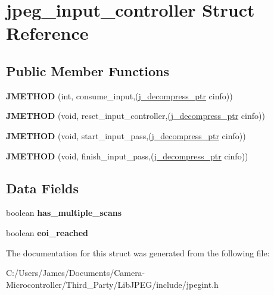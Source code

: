 \hypertarget{structjpeg__input__controller}{}\section{jpeg\+\_\+input\+\_\+controller Struct Reference}
\label{structjpeg__input__controller}
\subsection*{Public Member Functions}
\begin{DoxyCompactItemize}
\item 
\mbox{\label{structjpeg__input__controller_a8a59f501149d0f9fb8dc6d6ae18f819f}} 
{\bfseries J\+M\+E\+T\+H\+OD} (int, consume\+\_\+input,(\hyperlink{structjpeg__decompress__struct}{j\+\_\+decompress\+\_\+ptr} cinfo))
\item 
\mbox{\label{structjpeg__input__controller_a716de06ea9474eb56db8717a35204666}} 
{\bfseries J\+M\+E\+T\+H\+OD} (void, reset\+\_\+input\+\_\+controller,(\hyperlink{structjpeg__decompress__struct}{j\+\_\+decompress\+\_\+ptr} cinfo))
\item 
\mbox{\label{structjpeg__input__controller_a0dac168019b77859a6196eeaad33f240}} 
{\bfseries J\+M\+E\+T\+H\+OD} (void, start\+\_\+input\+\_\+pass,(\hyperlink{structjpeg__decompress__struct}{j\+\_\+decompress\+\_\+ptr} cinfo))
\item 
\mbox{\label{structjpeg__input__controller_a23fe60961372171ceea85e57c3a4f525}} 
{\bfseries J\+M\+E\+T\+H\+OD} (void, finish\+\_\+input\+\_\+pass,(\hyperlink{structjpeg__decompress__struct}{j\+\_\+decompress\+\_\+ptr} cinfo))
\end{DoxyCompactItemize}
\subsection*{Data Fields}
\begin{DoxyCompactItemize}
\item 
\mbox{\label{structjpeg__input__controller_a9eba83c8909e0055881f431c1ad125ea}} 
boolean {\bfseries has\+\_\+multiple\+\_\+scans}
\item 
\mbox{\label{structjpeg__input__controller_a051612f5bec99724383d859fb006f13a}} 
boolean {\bfseries eoi\+\_\+reached}
\end{DoxyCompactItemize}


The documentation for this struct was generated from the following file\+:\begin{DoxyCompactItemize}
\item 
C\+:/\+Users/\+James/\+Documents/\+Camera-\/\+Microcontroller/\+Third\+\_\+\+Party/\+Lib\+J\+P\+E\+G/include/jpegint.\+h\end{DoxyCompactItemize}

